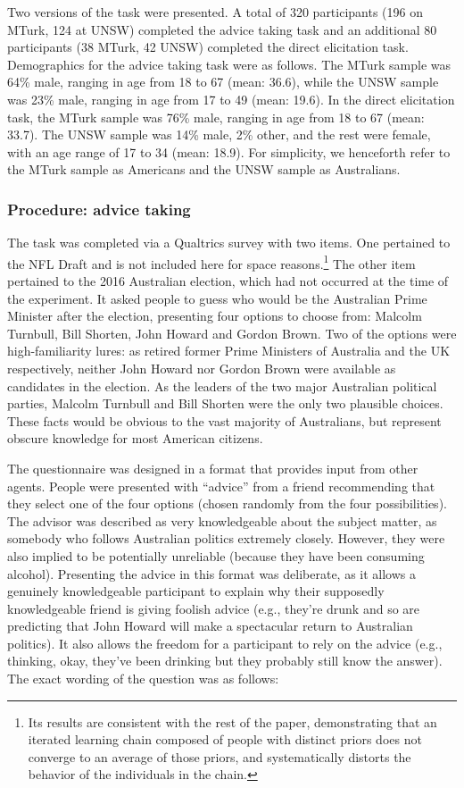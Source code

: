 \documentclass[doc]{apa6}
\begin{document}
Two versions of the task were presented. A total of 320 participants (196 on MTurk, 124 at UNSW) completed the {\sc advice taking} task and an additional 80 participants (38 MTurk, 42 UNSW) completed the {\sc direct elicitation task}. Demographics for the {\sc advice taking} task were as follows. The MTurk sample was 64\% male, ranging in age from 18 to 67 (mean: 36.6), while the UNSW sample was 23\% male, ranging in age from 17 to 49 (mean: 19.6). In the {\sc direct elicitation task}, the MTurk sample was 76\% male, ranging in age from 18 to 67 (mean: 33.7). The UNSW sample was 14\% male, 2\% other, and the rest were female, with an age range of 17 to 34 (mean: 18.9). For simplicity, we henceforth refer to the MTurk sample as Americans and the UNSW sample as Australians.

\bigskip
\subsubsection{Procedure: advice taking}

The task was completed via a Qualtrics survey with two items. One pertained to the NFL Draft and is not included here for space reasons.\footnote{Its results are consistent with the rest of the paper, demonstrating that an iterated learning chain composed of people with distinct priors does not converge to an average of those priors, and systematically distorts the behavior of the individuals in the chain.} The other item pertained to the 2016 Australian election, which had not occurred at the time of the experiment. It asked people to guess who would be the Australian Prime Minister after the election, presenting four options to choose from: Malcolm Turnbull, Bill Shorten, John Howard and Gordon Brown. Two of the options were high-familiarity lures: as retired former Prime Ministers of Australia and the UK respectively, neither John Howard nor Gordon Brown were available as candidates in the election. As the leaders of the two major Australian political parties, Malcolm Turnbull and Bill Shorten were the only two plausible choices. These facts would be obvious to the vast majority of Australians, but represent obscure knowledge for most American citizens. 


The questionnaire was designed in a format that provides input from other agents. People were presented with ``advice'' from a friend recommending that they select one of the four options (chosen randomly from the four possibilities). The advisor was described as very knowledgeable about the subject matter, as somebody who follows Australian politics extremely closely. However, they were also implied to be potentially unreliable (because they have been consuming alcohol). Presenting the advice in this format was deliberate, as it allows a genuinely knowledgeable participant to explain why their supposedly knowledgeable friend is giving foolish advice (e.g., they're drunk and so are predicting that John Howard will make a spectacular return to Australian politics). It also allows the freedom for a participant to rely on the advice (e.g., thinking, okay, they've been drinking but they probably still know the answer). The exact wording of the question was as follows:
\end{document}
